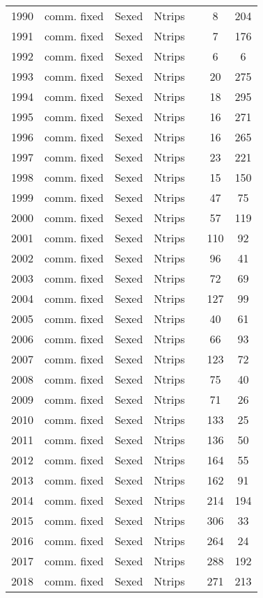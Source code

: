 \begin{longtable}[t]{c>{\centering\arraybackslash}p{3cm}ccccc}
1990 & comm. fixed & Sexed & Ntrips &  & 8 & 204\\
1991 & comm. fixed & Sexed & Ntrips &  & 7 & 176\\
1992 & comm. fixed & Sexed & Ntrips &  & 6 & 6\\
1993 & comm. fixed & Sexed & Ntrips &  & 20 & 275\\
1994 & comm. fixed & Sexed & Ntrips &  & 18 & 295\\
1995 & comm. fixed & Sexed & Ntrips &  & 16 & 271\\
1996 & comm. fixed & Sexed & Ntrips &  & 16 & 265\\
1997 & comm. fixed & Sexed & Ntrips &  & 23 & 221\\
1998 & comm. fixed & Sexed & Ntrips &  & 15 & 150\\
1999 & comm. fixed & Sexed & Ntrips &  & 47 & 75\\
2000 & comm. fixed & Sexed & Ntrips &  & 57 & 119\\
2001 & comm. fixed & Sexed & Ntrips &  & 110 & 92\\
2002 & comm. fixed & Sexed & Ntrips &  & 96 & 41\\
2003 & comm. fixed & Sexed & Ntrips &  & 72 & 69\\
2004 & comm. fixed & Sexed & Ntrips &  & 127 & 99\\
2005 & comm. fixed & Sexed & Ntrips &  & 40 & 61\\
2006 & comm. fixed & Sexed & Ntrips &  & 66 & 93\\
2007 & comm. fixed & Sexed & Ntrips &  & 123 & 72\\
2008 & comm. fixed & Sexed & Ntrips &  & 75 & 40\\
2009 & comm. fixed & Sexed & Ntrips &  & 71 & 26\\
2010 & comm. fixed & Sexed & Ntrips &  & 133 & 25\\
2011 & comm. fixed & Sexed & Ntrips &  & 136 & 50\\
2012 & comm. fixed & Sexed & Ntrips &  & 164 & 55\\
2013 & comm. fixed & Sexed & Ntrips &  & 162 & 91\\
2014 & comm. fixed & Sexed & Ntrips &  & 214 & 194\\
2015 & comm. fixed & Sexed & Ntrips &  & 306 & 33\\
2016 & comm. fixed & Sexed & Ntrips &  & 264 & 24\\
2017 & comm. fixed & Sexed & Ntrips &  & 288 & 192\\
2018 & comm. fixed & Sexed & Ntrips &  & 271 & 213\\

\end{longtable}
